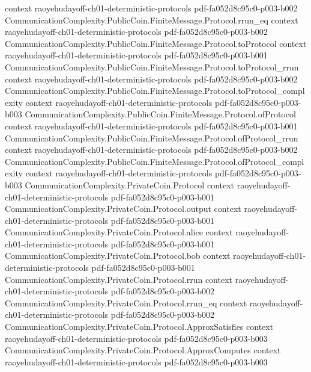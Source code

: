 \begin{theorem}
  {context}
  {raoyehudayoff-ch01-deterministic-protocols}
  {pdf-fa052d8c95c0-p003-b002}
\proofstep
  {CommunicationComplexity.PublicCoin.FiniteMessage.Protocol.rrun_eq}
  {context}
  {raoyehudayoff-ch01-deterministic-protocols}
  {pdf-fa052d8c95c0-p003-b002}
\proofstep
  {CommunicationComplexity.PublicCoin.FiniteMessage.Protocol.toProtocol}
  {context}
  {raoyehudayoff-ch01-deterministic-protocols}
  {pdf-fa052d8c95c0-p003-b001}
\proofstep
  {CommunicationComplexity.PublicCoin.FiniteMessage.Protocol.toProtocol_rrun}
  {context}
  {raoyehudayoff-ch01-deterministic-protocols}
  {pdf-fa052d8c95c0-p003-b002}
\proofstep
  {CommunicationComplexity.PublicCoin.FiniteMessage.Protocol.toProtocol_complexity}
  {context}
  {raoyehudayoff-ch01-deterministic-protocols}
  {pdf-fa052d8c95c0-p003-b003}
\proofstep
  {CommunicationComplexity.PublicCoin.FiniteMessage.Protocol.ofProtocol}
  {context}
  {raoyehudayoff-ch01-deterministic-protocols}
  {pdf-fa052d8c95c0-p003-b001}
\proofstep
  {CommunicationComplexity.PublicCoin.FiniteMessage.Protocol.ofProtocol_rrun}
  {context}
  {raoyehudayoff-ch01-deterministic-protocols}
  {pdf-fa052d8c95c0-p003-b002}
\proofstep
  {CommunicationComplexity.PublicCoin.FiniteMessage.Protocol.ofProtocol_complexity}
  {context}
  {raoyehudayoff-ch01-deterministic-protocols}
  {pdf-fa052d8c95c0-p003-b003}
\proofstep
  {CommunicationComplexity.PrivateCoin.Protocol}
  {context}
  {raoyehudayoff-ch01-deterministic-protocols}
  {pdf-fa052d8c95c0-p003-b001}
\proofstep
  {CommunicationComplexity.PrivateCoin.Protocol.output}
  {context}
  {raoyehudayoff-ch01-deterministic-protocols}
  {pdf-fa052d8c95c0-p003-b001}
\proofstep
  {CommunicationComplexity.PrivateCoin.Protocol.alice}
  {context}
  {raoyehudayoff-ch01-deterministic-protocols}
  {pdf-fa052d8c95c0-p003-b001}
\proofstep
  {CommunicationComplexity.PrivateCoin.Protocol.bob}
  {context}
  {raoyehudayoff-ch01-deterministic-protocols}
  {pdf-fa052d8c95c0-p003-b001}
\proofstep
  {CommunicationComplexity.PrivateCoin.Protocol.rrun}
  {context}
  {raoyehudayoff-ch01-deterministic-protocols}
  {pdf-fa052d8c95c0-p003-b002}
\proofstep
  {CommunicationComplexity.PrivateCoin.Protocol.rrun_eq}
  {context}
  {raoyehudayoff-ch01-deterministic-protocols}
  {pdf-fa052d8c95c0-p003-b002}
\proofstep
  {CommunicationComplexity.PrivateCoin.Protocol.ApproxSatisfies}
  {context}
  {raoyehudayoff-ch01-deterministic-protocols}
  {pdf-fa052d8c95c0-p003-b003}
\proofstep
  {CommunicationComplexity.PrivateCoin.Protocol.ApproxComputes}
  {context}
  {raoyehudayoff-ch01-deterministic-protocols}
  {pdf-fa052d8c95c0-p003-b003}
\proofstep

\end{theorem}
